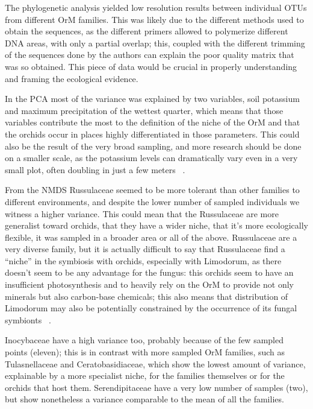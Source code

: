 The phylogenetic analysis yielded low resolution results between individual OTUs from different OrM families. This was likely due to the different methods used to obtain the sequences, as the different primers allowed to polymerize different DNA areas, with only a partial overlap; this, coupled with the different trimming of the sequences done by the authors can explain the poor quality matrix that was so obtained. This piece of data would be crucial in properly understanding and framing the ecological evidence.

In the PCA most of the variance was explained by two variables, soil potassium and maximum precipitation of the wettest quarter, which means that those variables contribute the most to the definition of the niche of the OrM and that the orchids occur in places highly differentiated in those parameters. This could also be the result of the very broad sampling, and more research should be done on a smaller scale, as the potassium levels can dramatically vary even in a very small plot, often doubling in just a few meters ~\citep{bogunovic2014}.

From the NMDS Russulaceae seemed to be more tolerant than other families to different environments, and despite the lower number of sampled individuals we witness a higher variance. This could mean that the Russulaceae are more generalist toward orchids, that they have a wider niche, that it's more ecologically flexible, it was sampled in a broader area or all of the above. Russulaceae are a very diverse family, but it is actually difficult to say that Russulaceae find a ``niche'' in the symbiosis with orchids, especially with Limodorum, as there doesn't seem to be any advantage for the fungus: this orchids seem to have an insufficient photosynthesis and to heavily rely on the OrM to provide not only minerals but also carbon-base chemicals; this also means that distribution of Limodorum may also be potentially constrained by the occurrence of its fungal symbionts ~\citep{girlanda2005}.

Inocybaceae have a high variance too, probably because of the few sampled points (eleven); this is in contrast with more sampled OrM families, such as Tulasnellaceae and Ceratobasidiaceae, which show the lowest amount of variance, explainable by a more specialist niche, for the families themselves or for the orchids that host them. Serendipitaceae have a very low number of samples (two), but show nonetheless a variance comparable to the mean of all the families.

